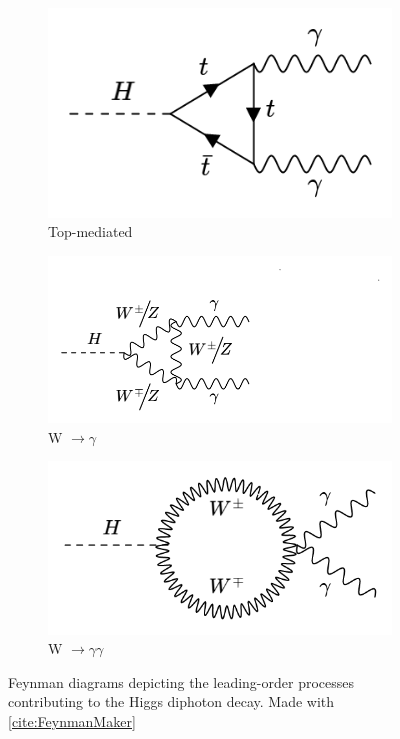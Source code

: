 \begin{figure}[htp]
  \centering
       \begin{subfigure}[b]{0.3\textwidth}
         \centering
         \includegraphics[width=\textwidth]{figures/theory_chapter/toploop.png}
         \caption{Top-mediated}
         \label{fig:toploop}
     \end{subfigure}
     \hfill
         \begin{subfigure}[b]{0.3\textwidth}
         \centering
         \includegraphics[width=\textwidth]{figures/theory_chapter/Wloop1.png}
         \caption{W $\rightarrow \gamma$ }
         \label{fig:Wloop1}
     \end{subfigure}
     \hfill 
        \begin{subfigure}[b]{0.3\textwidth}
         \centering
         \includegraphics[width=\textwidth]{figures/theory_chapter/Wloop2.png}
         \caption{W $\rightarrow \gamma \gamma$}
         \label{fig:Wloop2}
     \end{subfigure}
     \hfill
  \label{fig:loopmodes}
  \caption{Feynman diagrams depicting the leading-order processes contributing to the Higgs diphoton decay. Made with \ref{cite:FeynmanMaker}}  
\end{figure}


